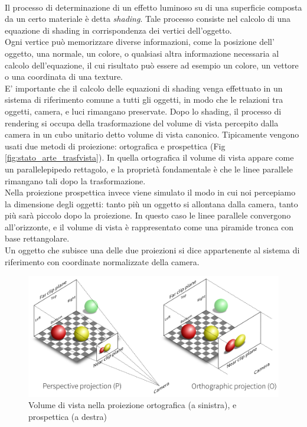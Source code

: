 \\ 
Il processo di determinazione di un effetto luminoso su di una superficie composta da un certo materiale è detta \emph{shading}. 
Tale processo consiste nel calcolo di una equazione di shading in corrispondenza dei vertici dell’oggetto. 
\\
Ogni vertice può memorizzare diverse informazioni, come la posizione dell’ oggetto, una normale, un colore, o qualsiasi altra informazione necessaria al calcolo dell’equazione, il cui risultato può essere ad esempio un colore, un vettore o una coordinata di una texture.
\\ 
E’ importante che il calcolo delle equazioni di shading venga effettuato in un sistema di riferimento comune a tutti gli oggetti, in modo che le relazioni tra oggetti, camera, e luci rimangano preservate. 
Dopo lo shading, il processo di rendering si occupa della trasformazione del volume di vista percepito dalla camera in un cubo unitario detto volume di vista canonico.
Tipicamente vengono usati due metodi di proiezione: ortografica e prospettica (Fig \ref{fig:stato_arte_trasfvista}).
In quella ortografica il volume di vista appare come un parallelepipedo rettagolo, e la proprietà fondamentale è che le linee parallele rimangano tali dopo la trasformazione.
\\
Nella proiezione prospettica invece viene simulato il modo in cui noi percepiamo la dimensione degli oggetti: tanto più un oggetto si allontana dalla camera, tanto più sarà piccolo dopo la proiezione. In questo caso le linee parallele convergono all’orizzonte, e il volume di vista è rappresentato come una piramide tronca con base rettangolare.
\\
Un oggetto che subisce una delle due proiezioni  si dice appartenente al sistema di riferimento con coordinate normalizzate della camera. 
\\
\begin{figure}[htb]
 \centering
 \includegraphics[width=0.8\linewidth]{images/chapter_stato_arte/stato_arte_projections.png}\hfill
 \caption[Proiezione prospettica ed ortogonale]{Volume di vista nella proiezione ortografica (a sinistra), e prospettica (a destra)}
 \label{fig:stato_arte_projections}
\end{figure}
